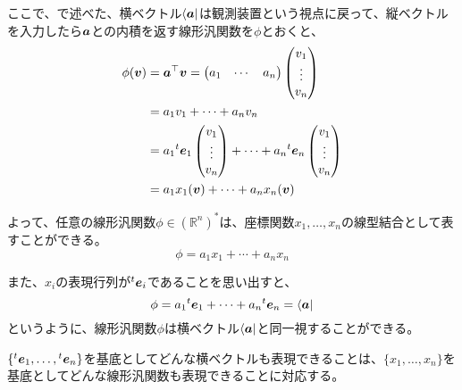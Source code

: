 \documentclass[../../../topic_linear-algebra]{subfiles}
\begin{document}
ここで、で述べた、{横ベクトル$\bra{\vb*{a}}$は観測装置}という視点に戻って、縦ベクトルを入力したら$\vb*{a}$との内積を返す線形汎関数を$\phi$とおくと、
\begin{align*}
  \phi(\vb*{v}) &= \vb*{a}^\top \vb*{v} = \begin{pmatrix}
    a_1 & \cdots & a_n
  \end{pmatrix}
  \begin{pmatrix}
    v_1 \\
    \vdots \\
    v_n
  \end{pmatrix} \\
  &= a_1 v_1 + \cdots + a_n v_n \\
  & = a_1 {}^t\vb*{e}_1 \begin{pmatrix}
                               v_1    \\
                               \vdots \\
                               v_n
                             \end{pmatrix} + \cdots + a_n {}^t\vb*{e}_n \begin{pmatrix}
                                                                          v_1    \\
                                                                          \vdots \\
                                                                          v_n
                                                                        \end{pmatrix} \\
       & = a_1 x_1(\vb*{v}) + \cdots + a_n x_n(\vb*{v})
\end{align*}

よって、任意の線形汎関数$\phi \in (\mathbb{R}^n)^*$は、座標関数$x_1,\dots,x_n$の線型結合として表すことができる。
\begin{equation*}
  \phi = a_1 x_1 + \cdots + a_n x_n
\end{equation*}

また、$x_i$の表現行列が${}^t \vb*{e}_i$であることを思い出すと、
\begin{equation*}
  \phi = a_1 {}^t\vb*{e}_1 + \cdots + a_n {}^t\vb*{e}_n = \bra{\vb*{a}}
\end{equation*}
というように、線形汎関数$\phi$は横ベクトル$\bra{\vb*{a}}$と同一視することができる。

\br

$\{ {}^t\vb*{e}_1, \ldots, {}^t\vb*{e}_n \}$を基底としてどんな横ベクトルも表現できることは、$\{ x_1, \ldots, x_n \}$を基底としてどんな線形汎関数も表現できることに対応する。
\end{document}
